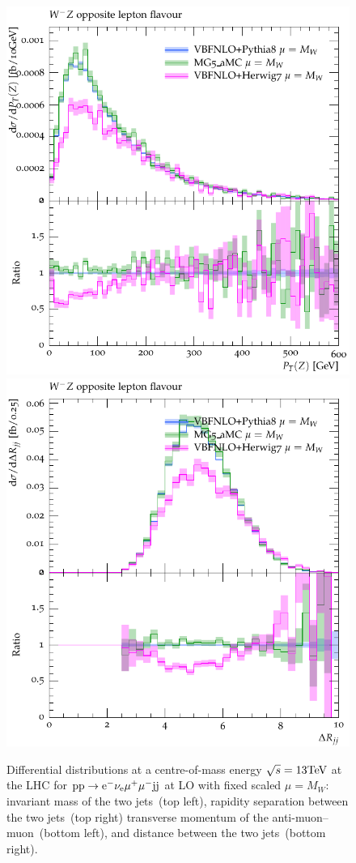 \documentclass[11pt]{cernrep}
\begin{document}
\begin{figure}[htbp]
\begin{center}
   \includegraphics[scale=0.5]{figs/VBFNLO_WmZ_OF_ZPt}
   \includegraphics[scale=0.5]{figs/VBFNLO_WmZ_OF_dRjj}
\caption{Differential distributions at a centre-of-mass energy $\sqrt{s}=13{\rm TeV}$ at the LHC for ${\rm p} {\rm p}
  \to {\rm e}^-  \nu_{\rm e}  \mu^+ \mu^- {\rm j} {\rm j}$ at LO with fixed scaled $\mu = M_W$: 
                invariant mass of the two jets~(top left),
                rapidity separation between the two jets~(top right)
                transverse momentum of the anti-muon--muon~(bottom left), and
                distance between the two jets~(bottom right).}
\label{vbs_fig_shower_1a}
\end{center}
\end{figure}
\end{document}
